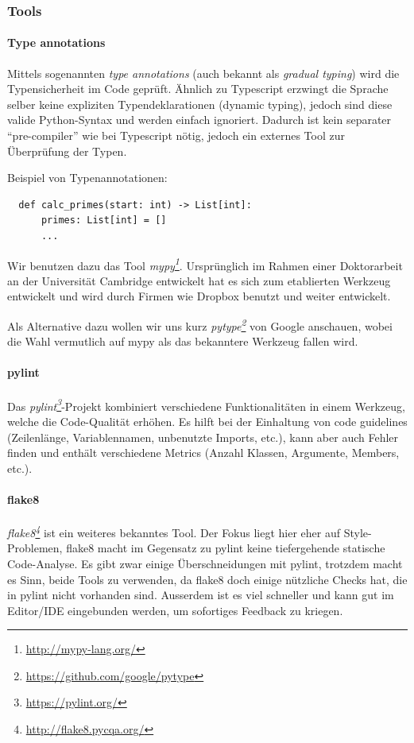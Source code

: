 \documentclass[a4paper]{article}
\newcommand{\tool}[2]{\emph{#1\footnote{\url{#2}}}}
\begin{document}
\subsubsection{Tools}
\label{sec:tools}

\paragraph{Type annotations} Mittels sogenannten \emph{type annotations} (auch
bekannt als \emph{gradual typing}) wird die Typensicherheit im Code geprüft.
Ähnlich zu Typescript erzwingt die Sprache selber keine expliziten
Typendeklarationen (dynamic typing), jedoch sind diese valide Python-Syntax und
werden einfach ignoriert. Dadurch ist kein separater ``pre-compiler'' wie bei
Typescript nötig, jedoch ein externes Tool zur Überprüfung der Typen.

Beispiel von Typenannotationen:

\begin{verbatim}
  def calc_primes(start: int) -> List[int]:
      primes: List[int] = []
      ...
\end{verbatim}

Wir benutzen dazu das Tool \tool{mypy}{http://mypy-lang.org/}.
Ursprünglich im Rahmen einer Doktorarbeit an der Universität Cambridge
entwickelt hat es sich zum etablierten Werkzeug entwickelt und wird durch Firmen
wie Dropbox benutzt und weiter entwickelt.

Als Alternative dazu wollen wir uns kurz
\tool{pytype}{https://github.com/google/pytype} von Google
anschauen, wobei die Wahl vermutlich auf mypy als das bekanntere Werkzeug fallen wird.

\paragraph{pylint} Das \tool{pylint}{https://pylint.org/}-Projekt
kombiniert verschiedene Funktionalitäten in einem Werkzeug, welche die
Code-Qualität erhöhen. Es hilft bei der Einhaltung von code guidelines
(Zeilenlänge, Variablennamen, unbenutzte Imports, etc.), kann aber auch Fehler
finden und enthält verschiedene Metrics (Anzahl Klassen, Argumente, Members, etc.).

\paragraph{flake8} \tool{flake8}{http://flake8.pycqa.org/} ist
ein weiteres bekanntes Tool. Der Fokus liegt hier eher auf Style-Problemen,
flake8 macht im Gegensatz zu pylint keine tiefergehende statische Code-Analyse.
Es gibt zwar einige Überschneidungen mit pylint, trotzdem macht es Sinn, beide
Tools zu verwenden, da flake8 doch einige nützliche Checks hat, die in pylint
nicht vorhanden sind. Ausserdem ist es viel schneller und kann gut im Editor/IDE
eingebunden werden, um sofortiges Feedback zu kriegen.
\end{document}
